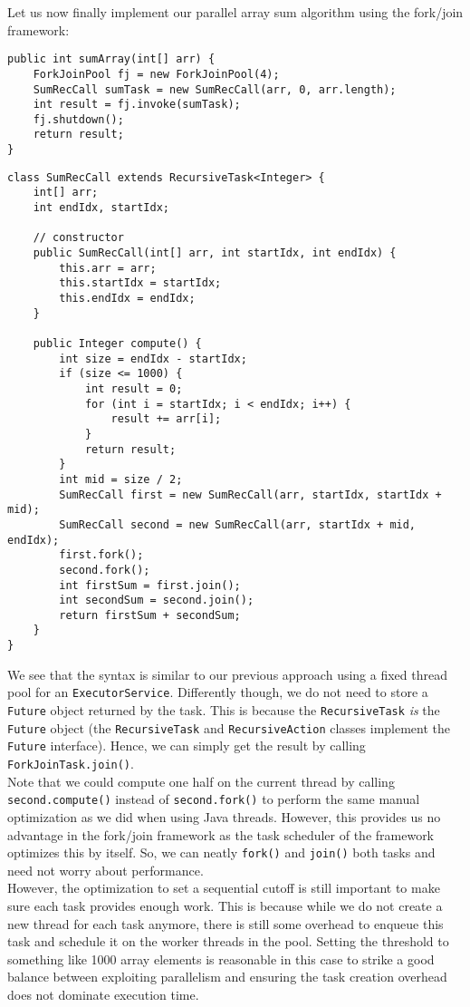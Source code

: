 \documentclass[main.tex]{subfiles}
\begin{document}
\noindent Let us now finally implement our parallel array sum algorithm using the fork/join framework:

\begin{verbatim}
public int sumArray(int[] arr) {
    ForkJoinPool fj = new ForkJoinPool(4);
    SumRecCall sumTask = new SumRecCall(arr, 0, arr.length);
    int result = fj.invoke(sumTask);
    fj.shutdown();
    return result;
}
\end{verbatim}

\begin{verbatim}
class SumRecCall extends RecursiveTask<Integer> {
    int[] arr;
    int endIdx, startIdx;

    // constructor
    public SumRecCall(int[] arr, int startIdx, int endIdx) {
        this.arr = arr;
        this.startIdx = startIdx;
        this.endIdx = endIdx;
    }

    public Integer compute() {
        int size = endIdx - startIdx;
        if (size <= 1000) {
            int result = 0;
            for (int i = startIdx; i < endIdx; i++) {
                result += arr[i];
            }
            return result;
        }
        int mid = size / 2;
        SumRecCall first = new SumRecCall(arr, startIdx, startIdx + mid);
        SumRecCall second = new SumRecCall(arr, startIdx + mid, endIdx);
        first.fork();
        second.fork();
        int firstSum = first.join();
        int secondSum = second.join();
        return firstSum + secondSum;
    }
}
\end{verbatim}

\noindent We see that the syntax is similar to our previous approach using a fixed thread pool for an \texttt{ExecutorService}. Differently though, we do not need to store a \texttt{Future} object returned by the task. This is because the \texttt{RecursiveTask} \textit{is} the \texttt{Future} object (the \texttt{RecursiveTask} and \texttt{RecursiveAction} classes implement the \texttt{Future} interface). Hence, we can simply get the result by calling \texttt{ForkJoinTask.join()}.\\[3mm]
Note that we could compute one half on the current thread by calling \texttt{second.compute()} instead of \texttt{second.fork()} to perform the same manual optimization as we did when using Java threads. However, this provides us no advantage in the fork/join framework as the task scheduler of the framework optimizes this by itself. So, we can neatly \texttt{fork()} and \texttt{join()} both tasks and need not worry about performance.\\
However, the optimization to set a sequential cutoff is still important to make sure each task provides enough work. This is because while we do not create a new thread for each task anymore, there is still some overhead to enqueue this task and schedule it on the worker threads in the pool. Setting the threshold to something like 1000 array elements is reasonable in this case to strike a good balance between exploiting parallelism and ensuring the task creation overhead does not dominate execution time.
\end{document}
